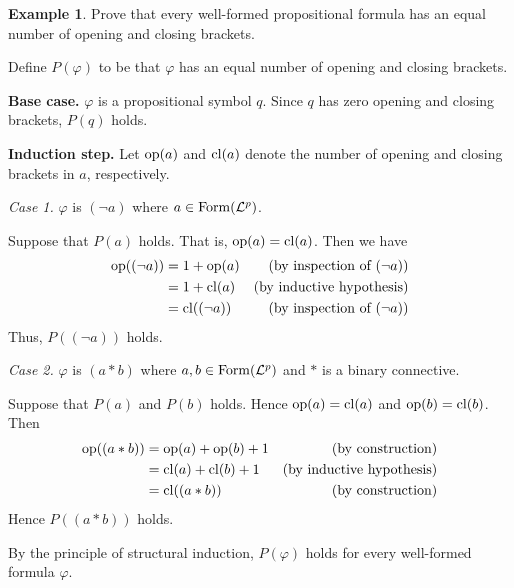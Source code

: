 \documentclass[11pt]{article}
\makeatletter
\theoremstyle{definition}
\newtheorem{exmp}[thm]{Example}
\newenvironment{pf}[1][\proofname]{\par
  \pushQED{\qed}%
  \normalfont \topsep0\p@\relax
  \trivlist
  \item[\hskip\labelsep\itshape
  #1\@addpunct{.}]\ignorespaces
}{%
  \popQED\endtrivlist\@endpefalse
}
\makeatother
\begin{document}
\begin{exmp}
Prove that every well-formed propositional formula has an equal number of opening and closing brackets.
\end{exmp}
\begin{pf} Define $P(\varphi)$ to be that $\varphi$ has an equal number of opening and closing brackets.

{\bf Base case.} $\varphi$ is a propositional symbol $q$. Since $q$ has zero opening and closing brackets, $P(q)$ holds.

{\bf Induction step.} Let ${\rm op}(a)$ and ${\rm cl}(a)$ denote the number of opening and closing brackets in $a$, respectively.

{\it Case 1.} $\varphi$ is $(\neg a)$ where $a \in {\rm Form}(\mathcal{L}^p)$. 

Suppose that $P(a)$ holds. That is, ${\rm op}(a) = {\rm cl}(a)$. Then we have
\begin{align*}
    {\rm op}((\neg a)) 
    &= 1 + {\rm op}(a) & \text{(by inspection of $(\neg a)$)} \\
    &= 1 + {\rm cl}(a) & \text{(by inductive hypothesis)} \\
    &= {\rm cl}((\neg a)) & \text{(by inspection of $(\neg a)$)}
\end{align*}
Thus, $P((\neg a))$ holds.

{\it Case 2.} $\varphi$ is $(a * b)$ where $a, b \in {\rm Form}(\mathcal{L}^p)$ and $*$ is a binary connective.

Suppose that $P(a)$ and $P(b)$ holds. Hence ${\rm op}(a) = {\rm cl}(a)$ and ${\rm op}(b) = {\rm cl}(b)$. Then
\begin{align*}
{\rm op}((a * b)) 
&= {\rm op}(a) + {\rm op}(b) + 1 & \text{(by construction)} \\
&= {\rm cl}(a) + {\rm cl}(b) + 1 & \text{(by inductive hypothesis)} \\
&= {\rm cl}((a * b)) & \text{(by construction)}
\end{align*}
Hence $P((a * b))$ holds.

By the principle of structural induction, $P(\varphi)$ holds for every well-formed formula $\varphi$.
\end{pf}
\end{document}
